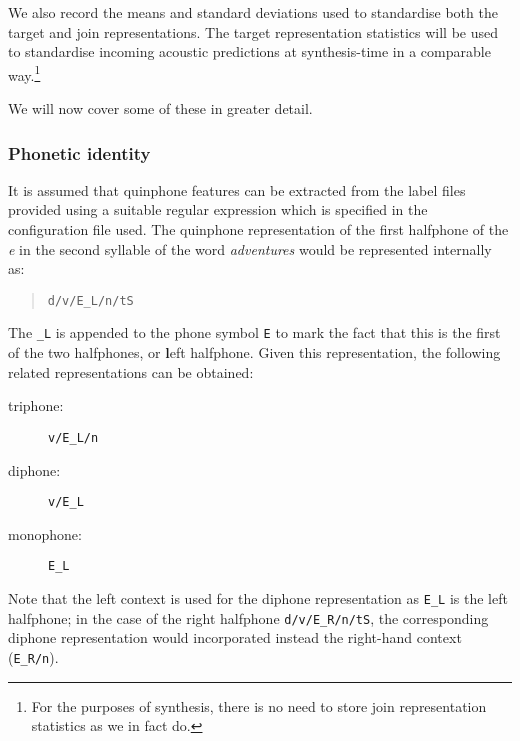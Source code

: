We also record the means and standard deviations used to standardise both the target and join representations. The target representation statistics will be used to standardise incoming acoustic predictions at synthesis-time in a comparable way.\footnote{For the purposes of synthesis, there is no need to store join representation statistics as we in fact do.}


We will now cover some of these in greater detail.

\subsubsection{Phonetic identity}
It is assumed that quinphone features can be extracted from the label files provided using a suitable regular expression which is specified in the configuration file used. The quinphone representation of the first halfphone of the \textit{e} in the second syllable of the word \textit{adventures} would be represented internally as: 

\begin{quotation}
{\tt d/v/E\_L/n/tS } %
\end{quotation}

\noindent The {\tt \_L} is appended to the phone symbol {\tt E} to mark the fact that this is the first of the two halfphones, or \textbf{l}eft halfphone. Given this representation, the following related representations can be obtained:

\begin{description}
    \item[triphone: ] {\tt v/E\_L/n}
    \item[diphone: ] {\tt v/E\_L}
    \item[monophone: ] {\tt E\_L}
\end{description}

\noindent Note that the left context is used for the diphone representation as {\tt E\_L} is the left halfphone; in the case of the right halfphone {\tt d/v/E\_R/n/tS}, the corresponding diphone representation would incorporated instead the right-hand context ({\tt E\_R/n}).
    


